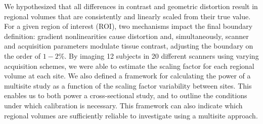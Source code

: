 We hypothesized that all differences in contrast and geometric distortion result in regional volumes that are consistently and linearly scaled from their true value. For a given region of interest (ROI), two mechanisms impact the final boundary definition: gradient nonlinearities cause distortion and, simultaneously, scanner and acquisition parameters modulate tissue contrast, adjusting the boundary on the order of $1-2\%$. By imaging 12 subjects in 20 different scanners using varying acquisition schemes, we were able to estimate the scaling factor for each regional volume at each site. We also defined a framework for calculating the power of a multisite study as a function of the scaling factor variability between sites. This enables us to both power a cross-sectional study, and to outline the conditions under which calibration is necessary. This framework can also indicate which regional volumes are sufficiently reliable to investigate using a multisite approach.